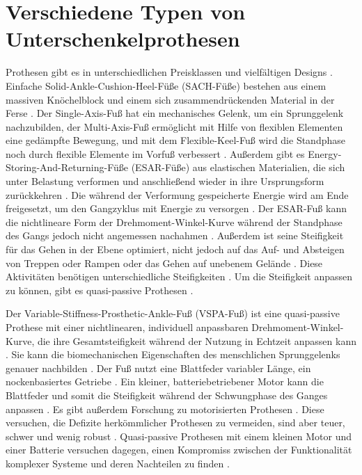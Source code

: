 \section{Verschiedene Typen von Unterschenkelprothesen}
Prothesen gibt es in unterschiedlichen Preisklassen und vielfältigen Designs \cite{Stevens.2018}.
Einfache Solid-Ankle-Cushion-Heel-Füße (SACH-Füße) bestehen aus einem massiven Knöchelblock und einem sich zusammendrückenden Material in der Ferse \cite{Stevens.2018}. Der Single-Axis-Fuß hat ein mechanisches Gelenk, um ein Sprunggelenk nachzubilden, der Multi-Axis-Fuß ermöglicht mit Hilfe von flexiblen Elementen eine gedämpfte Bewegung, und mit dem Flexible-Keel-Fuß wird die Standphase noch durch flexible Elemente im Vorfuß verbessert \cite{Stevens.2018}.
Außerdem gibt es Energy-Storing-And-Returning-Füße (ESAR-Füße) aus elastischen Materialien, die sich unter Belastung verformen und anschließend wieder in ihre Ursprungsform zurückkehren \cite{Stevens.2018}. Die während der Verformung gespeicherte Energie wird am Ende freigesetzt, um den Gangzyklus mit Energie zu versorgen \cite{Stevens.2018}.
Der ESAR-Fuß kann die nichtlineare Form der Drehmoment-Winkel-Kurve während der Standphase des Gangs jedoch nicht angemessen nachahmen \cite{Shepherd.2017}. Außerdem ist seine Steifigkeit für das Gehen in der Ebene optimiert, nicht jedoch auf das Auf- und Absteigen von Treppen oder Rampen oder das Gehen auf unebenem Gelände \cite{Shepherd.2017}. Diese Aktivitäten benötigen unterschiedliche Steifigkeiten \cite{Shepherd.2017}. Um die Steifigkeit anpassen zu können, gibt es quasi-passive Prothesen \cite{Shepherd.2017}.

Der Variable-Stiffness-Prosthetic-Ankle-Fuß (VSPA-Fuß) ist eine quasi-passive Prothese mit einer nichtlinearen, individuell anpassbaren Drehmoment-Winkel-Kurve, die ihre Gesamtsteifigkeit während der Nutzung in Echtzeit anpassen kann \cite{Shepherd.2017}. Sie kann die biomechanischen Eigenschaften des menschlichen Sprunggelenks genauer nachbilden \cite{Shepherd.2017}. Der Fuß nutzt eine Blattfeder variabler Länge, ein nockenbasiertes Getriebe \cite{Shetty.2022}. Ein kleiner, batteriebetriebener Motor kann die Blattfeder und somit die Steifigkeit während der Schwungphase des Ganges anpassen \cite{Shetty.2022}.
Es gibt außerdem Forschung zu motorisierten Prothesen \cite{Shetty.2022}. Diese versuchen, die Defizite herkömmlicher Prothesen zu vermeiden, sind aber teuer, schwer und wenig robust \cite{Shetty.2022}. Quasi-passive Prothesen mit einem kleinen Motor und einer Batterie versuchen dagegen, einen Kompromiss zwischen der Funktionalität komplexer Systeme und deren Nachteilen zu finden \cite{Shetty.2022}.
